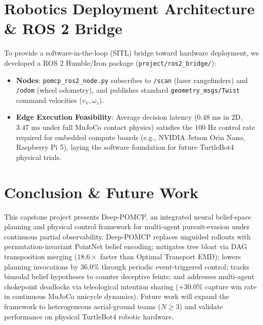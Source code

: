 \documentclass[conference]{IEEEtran}
\begin{document}
\section{Robotics Deployment Architecture \& ROS 2 Bridge}
To provide a software-in-the-loop (SITL) bridge toward hardware deployment, we developed a ROS 2 Humble/Iron package (\texttt{project/ros2\_bridge/}):
\begin{itemize}
    \item \textbf{Nodes}: \texttt{pomcp\_ros2\_node.py} subscribes to \texttt{/scan} (laser rangefinders) and \texttt{/odom} (wheel odometry), and publishes standard \texttt{geometry\_msgs/Twist} command velocities ($v_x, \omega_z$).
    \item \textbf{Edge Execution Feasibility}: Average decision latency ($0.48\text{ ms}$ in 2D, $3.47\text{ ms}$ under full MuJoCo contact physics) satisfies the $100\text{ Hz}$ control rate required for embedded compute boards (e.g., NVIDIA Jetson Orin Nano, Raspberry Pi 5), laying the software foundation for future TurtleBot4 physical trials.
\end{itemize}

\section{Conclusion \& Future Work}
This capstone project presents Deep-POMCP, an integrated neural belief-space planning and physical control framework for multi-agent pursuit-evasion under continuous partial observability. Deep-POMCP replaces unguided rollouts with permutation-invariant PointNet belief encoding; mitigates tree bloat via DAG transposition merging ($18.6\times$ faster than Optimal Transport EMD); lowers planning invocations by $36.0\%$ through periodic event-triggered control; tracks bimodal belief hypotheses to counter deceptive feints; and addresses multi-agent chokepoint deadlocks via teleological intention sharing ($+30.0\%$ capture win rate in continuous MuJoCo unicycle dynamics). Future work will expand the framework to heterogeneous aerial-ground teams ($N \ge 3$) and validate performance on physical TurtleBot4 robotic hardware.
\end{document}
